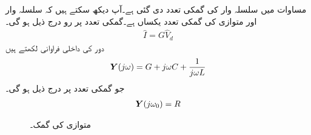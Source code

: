 مساوات  میں سلسلہ وار  کی گمکی تعدد دی گئی ہے۔آپ دیکھ سکتے ہیں کہ سلسلہ وار  اور متوازی  کی گمکی تعدد یکساں ہے۔گمکی تعدد پر رو درج ذیل ہو گی۔
\begin{align}\label{مساوات_تعددی_متوازی_کل_رو}
\hat{I}=G\hat{V}_d
\end{align}
دور کی داخلی فراوانی  لکھتے ہیں
\begin{align}
{\ensuremath{{\boldsymbol{Y}}}}(j\omega)=G+j\omega C+\frac{1}{j\omega L}
\end{align}
جو گمکی تعدد پر درج ذیل ہو گی۔
\begin{align}
{\ensuremath{{\boldsymbol{Y}}}}(j\omega_0)=R
\end{align}
%
\begin{figure}
\centering
{}
\caption{متوازی  کی گمک۔}
\label{شکل_تعددی_متوازی_گمک}
\end{figure}

